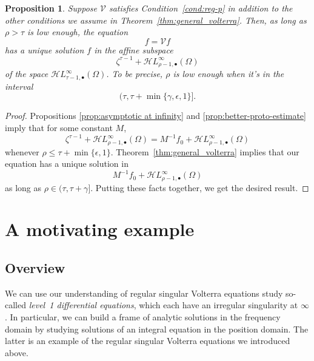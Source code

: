 \documentclass{article}
\theoremstyle{plain}
\newtheorem{prop}{Proposition}
\newcommand{\singexp}[2]{\mathcal{H}L^\infty_{#1, #2}}
\newcommand{\singexpalg}[1]{\singexp{#1}{\bullet}}
\newcommand{\volterra}{\mathcal{V}}
\newcommand{\solproto}{f_0}
\newcommand{\domain}{\Omega}
\begin{document}
\begin{prop}\label{prop:alt-general_volterra}
Suppose $\volterra$ satisfies {\em Condition~\eqref{cond:reg-p}} in addition to the other conditions we assume in {\em Theorem~\ref{thm:general_volterra}}. Then, as long as $\rho > \tau$ is low enough, the equation
\[f = \volterra f\]
has a unique solution $f$ in the affine subspace
\[ \zeta^{\tau-1}+\singexpalg{\rho-1}(\domain) \]
of the space $\singexpalg{\tau-1}(\domain)$. To be precise, $\rho$ is low enough when it's in the interval
\[ (\tau, \tau + \min\{\gamma, \epsilon, 1\}]. \]
\end{prop}

\begin{proof}
Propositions \ref{prop:asymptotic at infinity} and \ref{prop:better-proto-estimate} imply that for some constant $M$,
\[ \zeta^{\tau-1} + \singexpalg{\rho-1}(\domain) = M^{-1}\solproto + \singexpalg{\rho-1}(\domain) \]
whenever $\rho \le \tau + \min\{\epsilon, 1\}$. Theorem~\ref{thm:general_volterra} implies that our equation has a unique solution in
\[ M^{-1}\solproto + \singexpalg{\rho-1}(\domain) \]
as long as $\rho \in (\tau, \tau + \gamma]$. Putting these facts together, we get the desired result.
\end{proof}
\section{A motivating example}\label{sec:example}
\subsection{Overview}
We can use our understanding of regular singular Volterra equations study so-called \textit{level~1 differential equations}, which each have an irregular singularity at $\infty$. In particular, we can build a frame of analytic solutions in the frequency domain by studying solutions of an integral equation in the position domain. The latter is an example of the regular singular Volterra equations we introduced above.
\end{document}
